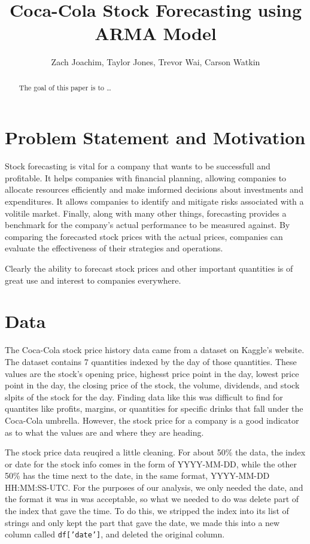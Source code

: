 \documentclass[12pt]{article}
\title{Coca-Cola Stock Forecasting using ARMA Model}
\author{Zach Joachim, Taylor Jones, Trevor Wai, Carson Watkin}
\begin{document}
\maketitle

\begin{abstract}
 The goal of this paper is to \dots
 \end{abstract}

\section{Problem Statement and Motivation}

Stock forecasting is vital for a company that wants to be successfull and profitable. It helps companies 
with financial planning, allowing companies to allocate resources efficiently and make imformed decisions 
about investments and expenditures. It allows companies to identify and mitigate risks associated with a 
volitile market. Finally, along with many other things, forecasting provides a benchmark for the company's 
actual performance to be measured against. By comparing the forecasted stock prices with the actual prices, 
companies can evaluate the effectiveness of their strategies and operations.\par
Clearly the ability to forecast stock prices and other important quantities is of great use and interest to 
companies everywhere.

\section{Data}

The Coca-Cola stock price history data came from a dataset on Kaggle's website. The dataset contains 7 quantities 
indexed by the day of those quantities. These values are the stock's opening price, highesst price point in the day, 
lowest price point in the day, the closing price of the stock, the volume, dividends, and stock slpits of the 
stock for the day. Finding data like this was difficult to find for quantites like profits, margins, or quantities 
for specific drinks that fall under the Coca-Cola umbrella. However, the stock price for a company is a good indicator 
as to what the values are and where they are heading.\par
The stock price data reuqired a little cleaning. For about 50\% the data, the index or date for the stock info 
comes in the form of YYYY-MM-DD, while the other 50\% has the time next to the date, in the same format, 
YYYY-MM-DD HH:MM:SS-UTC\@. For the purposes of our analysis, we only needed the date, and the format it was in was acceptable, 
so what we needed to do was delete part of the index that gave the time. To do this, we stripped the index 
into its list of strings and only kept the part that gave the date, we made this into a new column called \texttt{df['date']}, 
and deleted the original column.
\end{document}
